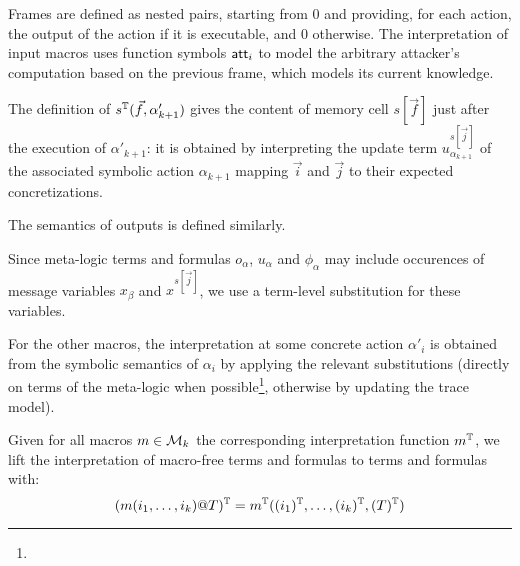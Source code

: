 Frames are defined as nested pairs, starting from $0$ and
providing, for each action, the output of the action if it is executable,
and $0$ otherwise. The interpretation of input macros uses function symbols $\mathsf{att}_i$ to model the arbitrary attacker's
computation based on the previous frame, which models its current knowledge.

The definition of $s^{\mathbb{T}}(\vec{f},\alpha'_{k+1})$ gives the content of memory
cell $s[\vec{f}]$ just after the execution of $\alpha'_{k+1}$:
it is obtained by interpreting the update term $u_{\alpha_{k+1}}^{s[\vec{j}]}$
of the associated symbolic action $\alpha_{k+1}$ mapping $\vec{i}$
and $\vec{j}$ to their expected concretizations.

The semantics of outputs is defined similarly.

Since meta-logic terms and formulas $o_{\alpha}$, $u_{\alpha}$ and
$\phi_{\alpha}$ may include occurences of message variables
$x_\beta$ and $x^{s[\vec{j}]}$,
we use a term-level substitution for these variables.



    For the other macros, the interpretation at some concrete
    action $\alpha'_i$ is obtained from the symbolic semantics of
    $\alpha_i$ by applying the relevant substitutions (directly
    on terms of the meta-logic when possible\footnote{
    }, otherwise by updating the trace model).

Given for all macros $m \in \mathcal{M}_k$ the corresponding interpretation function $m^{\mathbb{T}}$, we lift the interpretation of macro-free terms and formulas to terms and formulas with:
    \[ (m(i_1,\dots,i_k)@T)^{\mathbb{T}} = m^{\mathbb{T}}((i_1)^{\mathbb{T}},\dots,(i_k)^{\mathbb{T}},(T)^{\mathbb{T}}) \]




